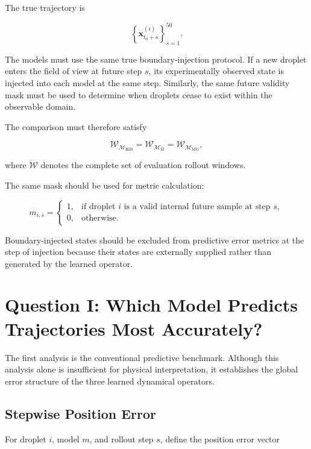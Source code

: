 \documentclass[11pt]{article}
\newcommand{\x}{\mathbf{x}}
\newcommand{\Mhist}{\mathcal{M}_{\mathrm{H20}}}
\newcommand{\Mmark}{\mathcal{M}_{\mathrm{M}}}
\newcommand{\Mgeom}{\mathcal{M}_{\mathrm{MG}}}
\begin{document}
The true trajectory is

\begin{equation}
\left\{
\x_{t_0+s}^{(i)}
\right\}_{s=1}^{50}.
\end{equation}

The models must use the same true boundary-injection protocol. If a new droplet enters the field of view at future step \(s\), its experimentally observed state is injected into each model at the same step. Similarly, the same future validity mask must be used to determine when droplets cease to exist within the observable domain.

The comparison must therefore satisfy

\begin{equation}
\mathcal{W}_{\Mhist}
=
\mathcal{W}_{\Mmark}
=
\mathcal{W}_{\Mgeom},
\end{equation}

where \(\mathcal{W}\) denotes the complete set of evaluation rollout windows.

The same mask should be used for metric calculation:

\begin{equation}
m_{i,s}
=
\begin{cases}
1, & \text{if droplet } i \text{ is a valid internal future sample at step } s,\\
0, & \text{otherwise}.
\end{cases}
\end{equation}

Boundary-injected states should be excluded from predictive error metrics at the step of injection because their states are externally supplied rather than generated by the learned operator.

\section{Question I: Which Model Predicts Trajectories Most Accurately?}

The first analysis is the conventional predictive benchmark. Although this analysis alone is insufficient for physical interpretation, it establishes the global error structure of the three learned dynamical operators.

\subsection{Stepwise Position Error}

For droplet \(i\), model \(m\), and rollout step \(s\), define the position error vector
\end{document}
